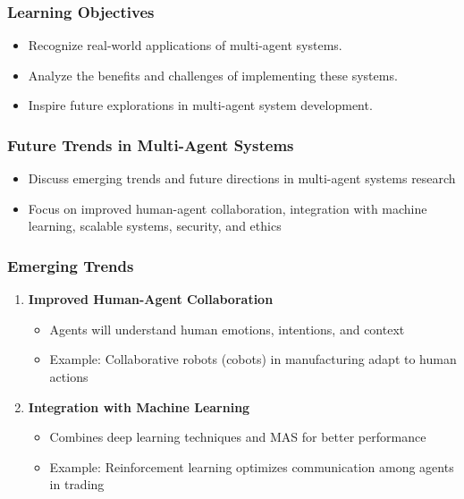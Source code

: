 \documentclass[aspectratio=169]{beamer}
\begin{document}
\begin{frame}[fragile]
    \frametitle{Learning Objectives}
    \begin{itemize}
        \item Recognize real-world applications of multi-agent systems.
        \item Analyze the benefits and challenges of implementing these systems.
        \item Inspire future explorations in multi-agent system development.
    \end{itemize}
\end{frame}

\begin{frame}[fragile]
    \frametitle{Future Trends in Multi-Agent Systems}
    \begin{itemize}
        \item Discuss emerging trends and future directions in multi-agent systems research
        \item Focus on improved human-agent collaboration, integration with machine learning, scalable systems, security, and ethics
    \end{itemize}
\end{frame}

\begin{frame}[fragile]
    \frametitle{Emerging Trends}
    \begin{enumerate}
        \item \textbf{Improved Human-Agent Collaboration}
            \begin{itemize}
                \item Agents will understand human emotions, intentions, and context
                \item Example: Collaborative robots (cobots) in manufacturing adapt to human actions
            \end{itemize}
        
        \item \textbf{Integration with Machine Learning}
            \begin{itemize}
                \item Combines deep learning techniques and MAS for better performance
                \item Example: Reinforcement learning optimizes communication among agents in trading
            \end{itemize}
    \end{enumerate}
\end{frame}
\end{document}
